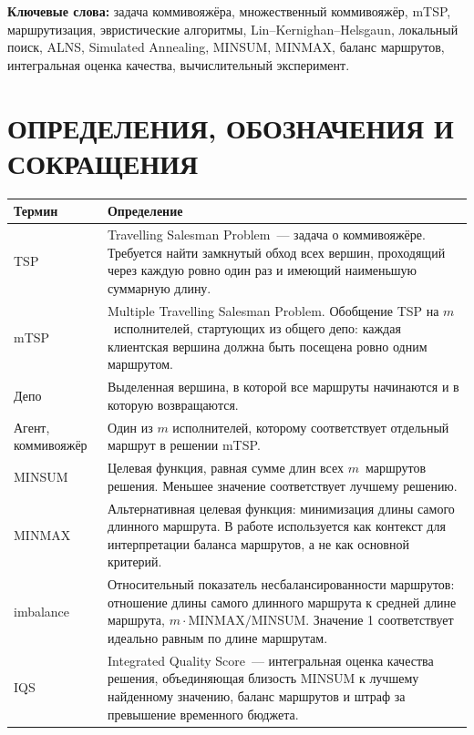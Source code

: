 \documentclass[14pt,a4paper]{extarticle}
\begin{document}
\textbf{Ключевые слова:} задача коммивояжёра, множественный коммивояжёр, mTSP, маршрутизация, эвристические алгоритмы, Lin--Kernighan--Helsgaun, локальный поиск, ALNS, Simulated Annealing, MINSUM, MINMAX, баланс маршрутов, интегральная оценка качества, вычислительный эксперимент.

\newpage
\tableofcontents
\newpage

\section*{ОПРЕДЕЛЕНИЯ, ОБОЗНАЧЕНИЯ И СОКРАЩЕНИЯ}

\begin{longtable}{>{\raggedright\arraybackslash}p{}>{\raggedright\arraybackslash}p{}}
\toprule
\textbf{Термин} & \textbf{Определение}\\
\midrule
\endhead
TSP & Travelling Salesman Problem~--- задача о коммивояжёре. Требуется найти замкнутый обход всех вершин, проходящий через каждую ровно один раз и имеющий наименьшую суммарную длину.\\
mTSP & Multiple Travelling Salesman Problem. Обобщение TSP на $m$~исполнителей, стартующих из общего депо: каждая клиентская вершина должна быть посещена ровно одним маршрутом.\\
Депо & Выделенная вершина, в которой все маршруты начинаются и в которую возвращаются.\\
Агент, коммивояжёр & Один из $m$ исполнителей, которому соответствует отдельный маршрут в решении mTSP.\\
MINSUM & Целевая функция, равная сумме длин всех $m$~маршрутов решения. Меньшее значение соответствует лучшему решению.\\
MINMAX & Альтернативная целевая функция: минимизация длины самого длинного маршрута. В работе используется как контекст для интерпретации баланса маршрутов, а не как основной критерий.\\
imbalance & Относительный показатель несбалансированности маршрутов: отношение длины самого длинного маршрута к средней длине маршрута, $m \cdot \mathrm{MINMAX}/\mathrm{MINSUM}$. Значение 1 соответствует идеально равным по длине маршрутам.\\
IQS & Integrated Quality Score~--- интегральная оценка качества решения, объединяющая близость MINSUM к лучшему найденному значению, баланс маршрутов и штраф за превышение временного бюджета.\\

\end{longtable}
\end{document}
